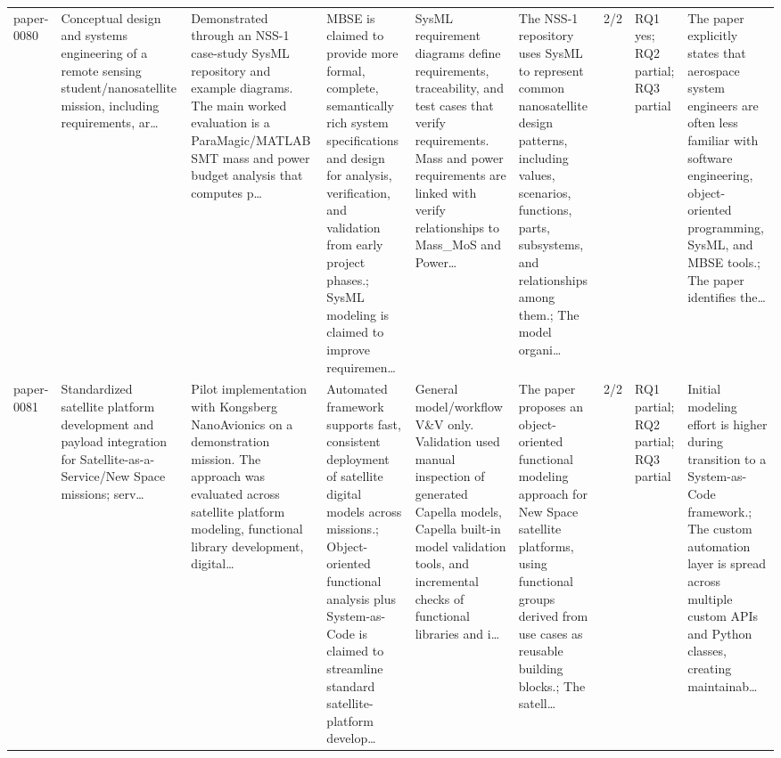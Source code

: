 \documentclass[10pt]{article}
\begin{document}
\begin{landscape}
\begin{longtable}{p{1.0cm}p{2.4cm}p{3.1cm}p{3.7cm}p{3.4cm}p{3.1cm}p{1.0cm}p{1.8cm}p{3.4cm}}
paper-0080 & Conceptual design and systems engineering of a remote sensing student/nanosatellite mission, including requirements, ar… & Demonstrated through an NSS-1 case-study SysML repository and example diagrams. The main worked evaluation is a ParaMagic/MATLAB SMT mass and power budget analysis that computes p… & MBSE is claimed to provide more formal, complete, semantically rich system specifications and design for analysis, verification, and validation from early project phases.; SysML modeling is claimed to improve requiremen… & SysML requirement diagrams define requirements, traceability, and test cases that verify requirements. Mass and power requirements are linked with verify relationships to Mass\_MoS and Power… & The NSS-1 repository uses SysML to represent common nanosatellite design patterns, including values, scenarios, functions, parts, subsystems, and relationships among them.; The model organi… & 2/2 & RQ1 yes; RQ2 partial; RQ3 partial & The paper explicitly states that aerospace system engineers are often less familiar with software engineering, object-oriented programming, SysML, and MBSE tools.; The paper identifies the… \\
paper-0081 & Standardized satellite platform development and payload integration for Satellite-as-a-Service/New Space missions; serv… & Pilot implementation with Kongsberg NanoAvionics on a demonstration mission. The approach was evaluated across satellite platform modeling, functional library development, digital… & Automated framework supports fast, consistent deployment of satellite digital models across missions.; Object-oriented functional analysis plus System-as-Code is claimed to streamline standard satellite-platform develop… & General model/workflow V\&V only. Validation used manual inspection of generated Capella models, Capella built-in model validation tools, and incremental checks of functional libraries and i… & The paper proposes an object-oriented functional modeling approach for New Space satellite platforms, using functional groups derived from use cases as reusable building blocks.; The satell… & 2/2 & RQ1 partial; RQ2 partial; RQ3 partial & Initial modeling effort is higher during transition to a System-as-Code framework.; The custom automation layer is spread across multiple custom APIs and Python classes, creating maintainab… \\
\bottomrule
\end{longtable}
\normalsize
\setlength{\tabcolsep}{6pt}
\end{landscape}
\end{document}
